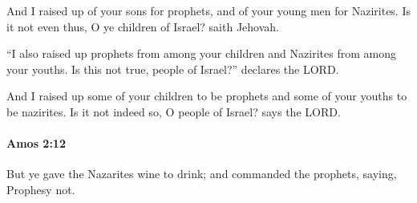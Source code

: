 			\begin{versebox}
					\item[BHS] 
					\item[LXX] 
					\item[ASV] And I raised up of your sons for prophets, and of your young men for Nazirites. Is it not even thus, O ye children of Israel? saith Jehovah.
					\item[NIV] “I also raised up prophets from among your children and Nazirites from among your youths. Is this not true, people of Israel?” declares the LORD.
					\item[NRSV] And I raised up some of your children to be prophets and some of your youths to be nazirites. Is it not indeed so, O people of Israel? says the LORD.
			\end{versebox}

		\paragraph{Amos 2:12} %
			\label{AMOS-2-12}

			But ye gave the Nazarites wine to drink; and commanded the prophets, saying, Prophesy not.

